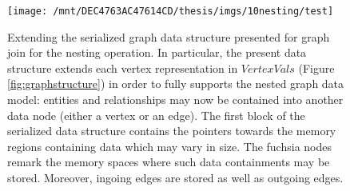 \begin{figure}
\centering
\texttt{[image: /mnt/DEC4763AC47614CD/thesis/imgs/10nesting/test]}
\caption{Extending the serialized graph data structure presented for graph join for the nesting operation. In particular, the present data structure extends each vertex representation in $VertexVals$ (Figure \vref{fig:graphstructure}) in order to fully supports the nested graph data model:
entities and relationships may now be contained into another data node (either a vertex or an edge). The first block of the serialized data structure contains the pointers towards the memory regions containing data which may vary in size. The fuchsia nodes remark the memory spaces where such data containments may be stored. Moreover, ingoing edges are stored as well as outgoing edges. }\label{nestedGraphVertex}
\end{figure}
